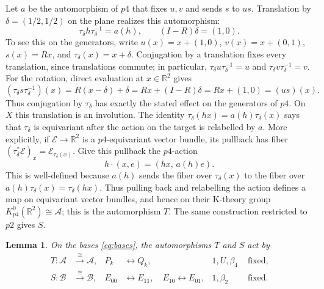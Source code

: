 \documentclass[11pt]{amsart}
\newcommand{\R}{\mathbb R}
\newtheorem{lemma}[theorem]{Lemma}
\theoremstyle{remark}
\numberwithin{equation}{section}
\begin{document}
Let $a$ be the automorphism of $p4$ that fixes $u,v$ and sends $s$ to $us$. Translation by $\delta=(1/2,1/2)$ on the plane realizes this automorphism:
\[
 \tau_\delta h\tau_\delta^{-1}=a(h),\qquad
 (I-R)\delta=(1,0).
\]
To see this on the generators, write $u(x)=x+(1,0)$,
$v(x)=x+(0,1)$, $s(x)=Rx$, and
$\tau_\delta(x)=x+\delta$. Conjugation by a translation fixes every
translation, since translations commute; in particular,
$\tau_\delta u\tau_\delta^{-1}=u$ and
$\tau_\delta v\tau_\delta^{-1}=v$. For the rotation, direct evaluation
at $x\in\R^2$ gives
\[
 (\tau_\delta s\tau_\delta^{-1})(x)
 =R(x-\delta)+\delta
 =Rx+(I-R)\delta
 =Rx+(1,0)
 =(us)(x).
\]
Thus conjugation by $\tau_\delta$ has exactly the stated effect on the
generators of $p4$.
On $X$ this translation is an involution. The identity
$\tau_\delta(hx)=a(h)\tau_\delta(x)$ says that
$\tau_\delta$ is equivariant after the action on the target is
relabelled by $a$. More explicitly, if $\mathcal E\to\R^2$ is a
$p4$-equivariant vector bundle, its pullback has fiber
$(\tau_\delta^*\mathcal E)_x=\mathcal E_{\tau_\delta(x)}$. Give this
pullback the $p4$-action
\[
 h\cdot(x,e)=(hx,\,a(h)e).
\]
This is well-defined because $a(h)$ sends the fiber over
$\tau_\delta(x)$ to the fiber over $a(h)\tau_\delta(x)=\tau_\delta(hx)$.
Thus pulling back and relabelling the action defines a map on
equivariant vector bundles, and hence on their K-theory group
$K_{p4}^0(\R^2)\cong\mathcal A$; this is the automorphism $T$.
The same construction restricted to $p2$ gives $S$.
\begin{lemma}\label{lem:actions-on-bases}
On the bases \eqref{eq:bases}, the automorphisms $T$ and $S$ act by
\[
\begin{aligned}
 T\colon\mathcal A&\xrightarrow{\cong}\mathcal A,&
 P_k&\leftrightarrow Q_k,&
 1,U,\beta_4&\text{ fixed},\\
 S\colon\mathcal B&\xrightarrow{\cong}\mathcal B,&
 E_{00}&\leftrightarrow E_{11},\quad
 E_{10}\leftrightarrow E_{01},&
 1,\beta_2&\text{ fixed}.
\end{aligned}
\]
\end{lemma}
\end{document}
